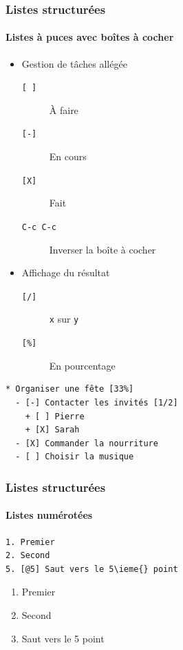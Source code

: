 \documentclass[presentation,t,hideothersubsections]{beamer}
\begin{document}
\begin{frame}[fragile]
\frametitle{Listes structurées}
\framesubtitle{Listes à puces avec boîtes à cocher}
\label{sec-2-6-3}


\begin{itemize}
\item Gestion de tâches allégée
\begin{description}
\item[\texttt{[ ]}] À faire
\item[\texttt{[-]}] En cours
\item[\texttt{[X]}] Fait
\item[\texttt{C-c C-c}] Inverser la boîte à cocher
\end{description}
\item Affichage du résultat
\begin{description}
\item[\texttt{[/]}] \texttt{x} sur \texttt{y}
\item[\texttt{[\%]}] En pourcentage
\end{description}
\end{itemize}


\lstset{language=org}
\begin{lstlisting}
* Organiser une fête [33%]
  - [-] Contacter les invités [1/2]
    + [ ] Pierre
    + [X] Sarah
  - [X] Commander la nourriture
  - [ ] Choisir la musique
\end{lstlisting}
\end{frame}
\begin{frame}[fragile]
\frametitle{Listes structurées}
\framesubtitle{Listes numérotées}
\label{sec-2-6-4}



\lstset{language=org}
\begin{lstlisting}
1. Premier
2. Second
5. [@5] Saut vers le 5\ieme{} point
\end{lstlisting}

\begin{enumerate}
\item Premier
\item Second
\setcounter{enumi}{4}
\item Saut vers le 5\ieme{} point
\end{enumerate}
\end{frame}
\end{document}
